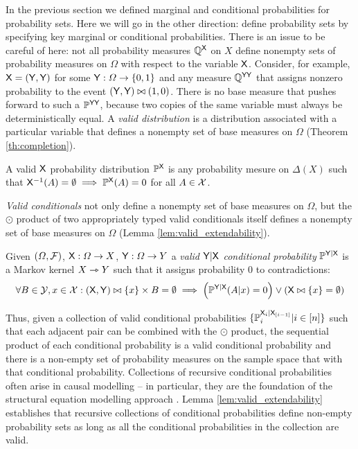 In the previous section we defined marginal and conditional probabilities for probability sets. Here we will go in the other direction: define probability sets by specifying key marginal or conditional probabilities. There is an issue to be careful of here: not all probability measures $\mathbb{Q}^{\mathsf{X}}$ on $X$ define nonempty sets of probability measures on $\Omega$ with respect to the variable $\mathsf{X}$. Consider, for example, $\mathsf{X}=(\mathsf{Y},\mathsf{Y})$ for some $\mathsf{Y}:\Omega\to \{0,1\}$ and any measure $\mathbb{Q}^{\mathsf{YY}}$ that assigns nonzero probability to the event $(\mathsf{Y},\mathsf{Y})\bowtie (1,0)$. There is no base measure that pushes forward to such a $\mathbb{P}^{\mathsf{YY}}$, because two copies of the same variable must always be deterministically equal. A \emph{valid distribution} is a distribution associated with a particular variable that defines a nonempty set of base measures on $\Omega$ (Theorem \ref{th:completion}).

\begin{definition}\label{def:valid_dist}
A valid $\mathsf{X}$ probability distribution $\mathbb{P}^{\mathsf{X}}$ is any probability mesure on $\Delta(X)$ such that $\mathsf{X}^{-1}(A)=\emptyset\implies \mathbb{P}^{\mathsf{X}}(A) = 0$ for all $A\in\mathcal{X}$.
\end{definition}

\emph{Valid conditionals} not only define a nonempty set of base measures on $\Omega$, but the $\odot$ product of two appropriately typed valid conditionals itself defines a nonempty set of base measures on $\Omega$ (Lemma \ref{lem:valid_extendability}). 

\begin{definition}\label{def:valid_conditional_prob}
Given $(\Omega,\mathcal{F})$, $\mathsf{X}:\Omega\to X$, $\mathsf{Y}:\Omega\to Y$ a \emph{valid $\mathsf{Y}|\mathsf{X}$ conditional probability} $\mathbb{P}^{\mathsf{Y}|\mathsf{X}}$ is a Markov kernel $X\rightarrowtriangle Y$ such that it assigns probability 0 to contradictions:
\begin{align}
    \forall B\in \mathcal{Y}, x\in \mathcal{X}: (\mathsf{X},\mathsf{Y})\bowtie \{x\}\times B = \emptyset \implies \left(\mathbb{P}^{\mathsf{Y}|\mathsf{X}}(A|x) = 0\right) \lor \left(\mathsf{X}\bowtie \{x\} = \emptyset\right)
\end{align}
\end{definition}

Thus, given a collection of valid conditional probabilities $\{\mathbb{P}_i^{\mathsf{X}_i|\mathsf{X}_{[i-1]}}|i\in [n]\}$ such that each adjacent pair can be combined with the $\odot$ product, the sequential product of each conditional probability is a valid conditional probability and there is a non-empty set of probability measures on the sample space that with that conditional probability. Collections of recursive conditional probabilities often arise in causal modelling -- in particular, they are the foundation of the structural equation modelling approach \citet{richardson2013single,pearl_causality:_2009}. Lemma \ref{lem:valid_extendability} establishes that recursive collections of conditional probabilities define non-empty probability sets as long as all the conditional probabilities in the collection are valid. 

